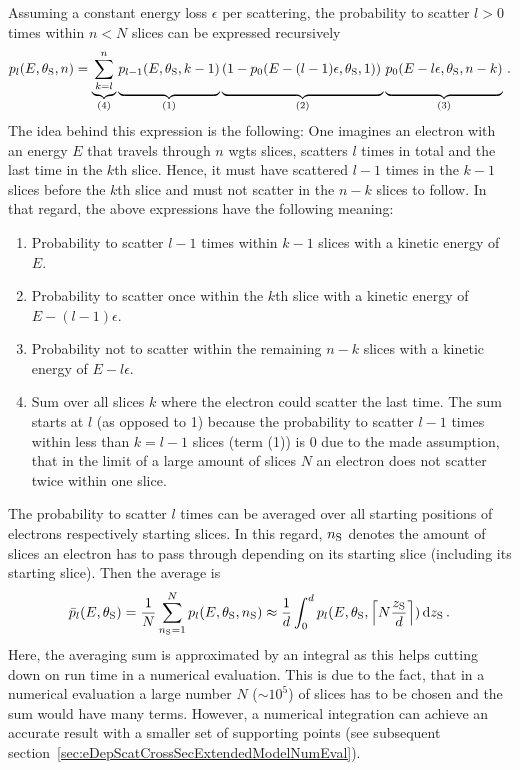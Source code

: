 Assuming a constant energy loss $\epsilon$ per scattering, the probability to scatter $l>0$ times within $n<N$ slices can be expressed recursively
\begin{equation}
\label{eq:eDepScatCrossSecExtendedModelFormalismCore}
p_l(E,\thetaSource,n) =
\underbrace{
	\sum_{k=l}^{n}
}_{(4)}
\underbrace{
	p_{l-1}(E,\thetaSource,k-1)
	\vphantom{\sum_{k=l}^{n}}
}_{(1)}
\underbrace{
	\left(
	1-p_0(E-(l-1)\epsilon,\thetaSource,1)
	\right)
	\vphantom{\sum_{k=l}^{n}}
}_{(2)}
\underbrace{
	p_0(E-l\epsilon,\thetaSource,n-k)
	\vphantom{\sum_{k=l}^{n}}
}_{(3)}
\fullstop
\end{equation}
The idea behind this expression is the following: One imagines an electron with an energy $E$ that travels through $n$ \gls{wgts} slices, scatters $l$ times in total and the last time in the $k$th slice. Hence, it must have scattered $l-1$ times in the $k-1$ slices before the $k$th slice and must not scatter in the $n-k$ slices to follow. In that regard, the above expressions have the following meaning:
\begin{enumerate}[(1)]
	\item Probability to scatter $l-1$ times within $k-1$ slices with a kinetic energy of $E$.
	\item Probability to scatter once within the $k$th slice with a kinetic energy of $E-(l-1)\epsilon$.
	\item Probability not to scatter within the remaining $n-k$ slices with a kinetic energy of $E-l\epsilon$.
	\item Sum over all slices $k$ where the electron could scatter the last time. The sum starts at $l$ (as opposed to 1) because the probability to scatter $l-1$ times within less than $k=l-1$ slices (term (1)) is 0 due to the made assumption, that in the limit of a large amount of slices $N$ an electron does not scatter twice within one slice.
\end{enumerate}
The probability to scatter $l$ times can be averaged over all starting positions of electrons respectively starting slices. In this regard, $n_\mathrm{S}$ denotes the amount of slices an electron has to pass through depending on its starting slice (including its starting slice). Then the average is
\begin{equation}
\label{eq:eDepScatCrossSecExtendedModelFormalismZAverage}
\bar{p}_l(E,\theta_\mathrm{S}) = 
\frac{1}{N}
\sum_{n_\mathrm{S}=1}^{N} p_l(E,\theta_\mathrm{S},n_\mathrm{S}) \approx
\frac{1}{d}
\int_{0}^{d}
p_l(E,\theta_\mathrm{S},
\left\lceil N \frac{z_\mathrm{S}}{d}\right\rceil
)
\mathop{}\!\mathrm{d} z_\mathrm{S}
\text{\,.}
\end{equation}
Here, the averaging sum is approximated by an integral as this helps cutting down on run time in a numerical evaluation. This is due to the fact, that in a numerical evaluation a large number $N$ ($\sim10^5$) of slices has to be chosen and the sum would have many terms. However, a numerical integration can achieve an accurate result with a smaller set of supporting points (see subsequent section~\ref{sec:eDepScatCrossSecExtendedModelNumEval}). 


